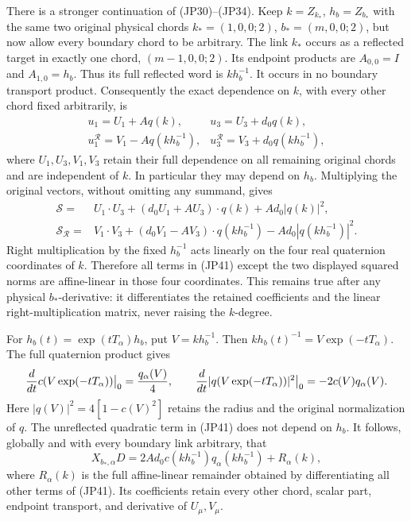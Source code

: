 \documentclass[11pt]{article}
\begin{document}
There is a stronger continuation of (JP30)–(JP34). Keep
\(k=Z_{k_*}\), \(h_b=Z_{b_*}\) with the same two original physical
chords \(k_*=(1,0,0;2)\), \(b_*=(m,0,0;2)\), but now allow every
boundary chord to be arbitrary. The link \(k_*\) occurs as a reflected
target in exactly one chord, \((m-1,0,0;2)\). Its endpoint products
are \(A_{0,0}=I\) and \(A_{1,0}=h_b\). Thus its full reflected word
is \(kh_b^{-1}\). It occurs in no boundary transport product.
Consequently the exact dependence on \(k\), with every other chord
fixed arbitrarily, is
\[
 \begin{array}{ll}
 u_1=U_1+Aq(k),& u_3=U_3+d_0q(k),\\
 u_1^{\mathcal R}=V_1-Aq(kh_b^{-1}),
   &u_3^{\mathcal R}=V_3+d_0q(kh_b^{-1}),
 \end{array}\tag{JP40}
\]
where \(U_1,U_3,V_1,V_3\) retain their full dependence on all
remaining original chords and are independent of \(k\). In particular
they may depend on \(h_b\). Multiplying the original vectors, without
omitting any summand, gives
\[
 \begin{aligned}
 \mathcal S={}&U_1\cdot U_3
       +(d_0U_1+AU_3)\cdot q(k)+Ad_0|q(k)|^2,\\
 \mathcal S_{\mathcal R}={}&V_1\cdot V_3
       +(d_0V_1-AV_3)\cdot q(kh_b^{-1})
                       -Ad_0|q(kh_b^{-1})|^2 .
 \end{aligned}\tag{JP41}
\]
Right multiplication by the fixed \(h_b^{-1}\) acts linearly on the
four real quaternion coordinates of \(k\). Therefore all terms in
(JP41) except the two displayed squared norms are affine-linear in
those four coordinates. This remains true after any physical
\(b_*\)-derivative: it differentiates the retained coefficients and
the linear right-multiplication matrix, never raising the \(k\)-degree.

For \(h_b(t)=\exp(tT_\alpha)h_b\), put \(V=kh_b^{-1}\).
Then \(kh_b(t)^{-1}=V\exp(-tT_\alpha)\). The full quaternion
product gives
\[
 {d\over dt}c(V\exp(-tT_\alpha))\big|_0
       ={q_\alpha(V)\over4},\qquad
 {d\over dt}|q(V\exp(-tT_\alpha))|^2\big|_0
       =-2c(V)q_\alpha(V).
\]
Here \(|q(V)|^2=4[1-c(V)^2]\) retains the radius and the original
normalization of \(q\). The unreflected quadratic term in (JP41)
does not depend on \(h_b\). It follows, globally and with every
boundary link arbitrary, that
\[
 X_{b_*,\alpha}D
   =2Ad_0c(kh_b^{-1})q_\alpha(kh_b^{-1})
                  +R_\alpha(k),
 \tag{JP42}
\]
where \(R_\alpha(k)\) is the full affine-linear remainder obtained
by differentiating all other terms of (JP41). Its coefficients
retain every other chord, scalar part, endpoint transport, and
derivative of \(U_\mu,V_\mu\).
\end{document}
